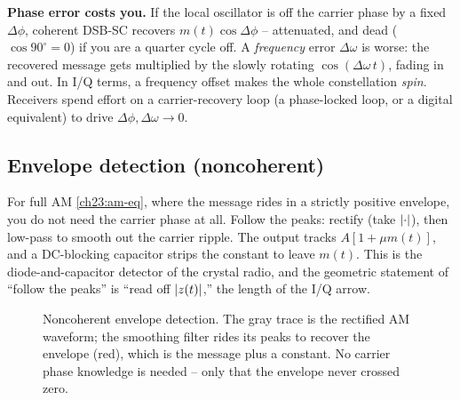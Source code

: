 \begin{trapbox}
\textbf{Phase error costs you.} If the local oscillator is off the carrier phase by a
fixed $\Delta\phi$, coherent DSB-SC recovers $m(t)\cos\Delta\phi$ -- attenuated, and dead
($\cos 90^\circ=0$) if you are a quarter cycle off. A \emph{frequency} error
$\Delta\omega$ is worse: the recovered message gets multiplied by the slowly rotating
$\cos(\Delta\omega\, t)$, fading in and out. In I/Q terms, a frequency offset makes the
whole constellation \emph{spin}. Receivers spend effort on a carrier-recovery
loop (a phase-locked loop, or a digital equivalent) to drive $\Delta\phi,\Delta\omega\to
0$.
\end{trapbox}

\subsection{Envelope detection (noncoherent)}
\label{ch23:envdet}

For full AM \eqref{ch23:am-eq}, where the message rides in a strictly positive envelope,
you do not need the carrier phase at all. Follow the peaks: rectify (take
$\lvert\cdot\rvert$), then low-pass to smooth out the carrier ripple. The output tracks
$A[1+\mu m(t)]$, and a DC-blocking capacitor strips the constant to leave $m(t)$. This is
the diode-and-capacitor detector of the crystal radio, and the geometric statement of
``follow the peaks'' is ``read off $\lvert z(t)\rvert$,'' the length of the I/Q arrow.

\begin{figure}[H]
\centering
{}
\caption{Noncoherent envelope detection. The gray trace is the rectified AM waveform; the
smoothing filter rides its peaks to recover the envelope (red), which is the message plus
a constant. No carrier phase knowledge is needed -- only that the envelope never crossed
zero.}
\label{ch23:fig-envdet}
\end{figure}

